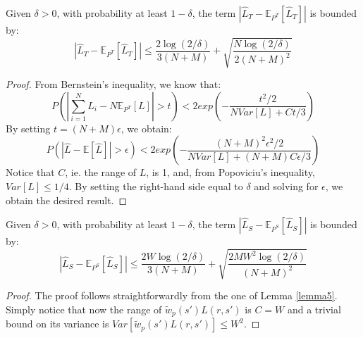       \begin{lemma}
        Given $\delta > 0$, with probability at least $1 - \delta$, the term $\left | \hat{L}_{T} - \mathbb{E}_{P^T} [\hat{L}_{T}] \right |$ is
        bounded by:
        \begin{equation}
          \left | \hat{L}_{T} - \mathbb{E}_{P^T} [\hat{L}_{T}] \right | \leq \frac{2\log(2/\delta)}{3(N+M)} + \sqrt{\frac{N\log(2/\delta)}{2(N+M)^{2}}}
        \end{equation}
        \label{lemma5}
      \end{lemma}
      \begin{proof}
        From Bernstein's inequality, we know that:
        \begin{equation}
          P \left ( \left | \sum_{i=1}^{N} L_{i} - N\mathbb{E}_{P^{T}}[L] \right | > t \right ) < 2 exp \left ( -\frac{t^{2}/2}{N Var[L] + Ct/3} \right )
        \end{equation}
        By setting $t = (N+M)\epsilon$, we obtain:
        \begin{equation}
          P \left ( \left | \hat{L} - \mathbb{E}[\hat{L}] \right | > \epsilon \right ) < 2 exp \left ( -\frac{(N+M)^{2}\epsilon^{2}/2}{N Var[L] + (N+M)C \epsilon /3} \right )
        \end{equation}
        Notice that $C$, ie. the range of $L$, is 1, and, from Popoviciu's inequality, $Var[L] \leq 1/4$. By setting
        the right-hand side equal to $\delta$ and solving for $\epsilon$, we obtain the desired result.
      \end{proof}

      \begin{lemma}
        Given $\delta > 0$, with probability at least $1-\delta$, the term $\left | \hat{L}_{S} - \mathbb{E}_{P^S}[\hat{L}_{S}] \right |$
        is bounded by:
        \begin{equation}
          \left | \hat{L}_{S} - \mathbb{E}_{P^S}[\hat{L}_{S}] \right | \leq \frac{2W\log(2/\delta)}{3(N+M)} + \sqrt{\frac{2MW^{2}\log(2/\delta)}{(N+M)^{2}}}
        \end{equation}
        \label{lemma6}
      \end{lemma}
      \begin{proof}
        The proof follows straightforwardly from the one of Lemma \ref{lemma5}. Simply notice that now the range of $\tilde{w}_{p}(s')L(r,s')$
        is $C = W$ and a trivial bound on its variance is $Var[\tilde{w}_{p}(s')L(r,s')] \leq W^{2}$.
      \end{proof}

